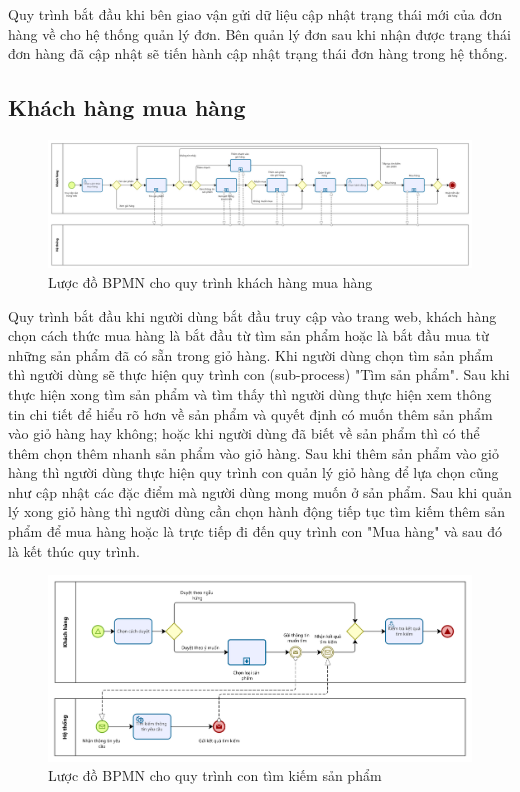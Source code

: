 Quy trình bắt đầu khi bên giao vận gửi dữ liệu cập nhật trạng thái mới của đơn hàng về cho hệ thống quản lý đơn. Bên quản lý đơn sau khi nhận được trạng thái đơn hàng đã cập nhật sẽ tiến hành cập nhật trạng thái đơn hàng trong hệ thống.

\subsection{Khách hàng mua hàng}
\begin{figure}[!htp]
    \centering
    \includegraphics[width=17cm]{img/BPMN/customer_buy/customer_buy.png}
    \newline
    \caption{Lược đồ BPMN cho quy trình khách hàng mua hàng}
\end{figure}
 
Quy trình bắt đầu khi người dùng bắt đầu truy cập vào trang web, khách hàng chọn cách thức mua hàng là bắt đầu từ tìm sản phẩm hoặc là bắt đầu mua từ những sản phẩm đã có sẵn trong giỏ hàng. Khi người dùng chọn tìm sản phẩm thì người dùng sẽ thực hiện quy trình con (sub-process) "Tìm sản phẩm". Sau khi thực hiện xong tìm sản phẩm và tìm thấy thì người dùng thực hiện xem thông tin chi tiết để hiểu rõ hơn về sản phẩm và quyết định có muốn thêm sản phẩm vào giỏ hàng hay không; hoặc khi người dùng đã biết về sản phẩm thì có thể thêm chọn thêm nhanh sản phẩm vào giỏ hàng. Sau khi thêm sản phẩm vào giỏ hàng thì người dùng thực hiện quy trình con quản lý giỏ hàng để lựa chọn cũng như cập nhật các đặc điểm mà người dùng mong muốn ở sản phẩm. Sau khi quản lý xong giỏ hàng thì người dùng cần chọn hành động tiếp tục tìm kiếm thêm sản phẩm để mua hàng hoặc là trực tiếp đi đến quy trình con "Mua hàng" và sau đó là kết thúc quy trình.
 
 
\begin{figure}[!htp]
    \centering
    \includegraphics[width=13cm]{img/BPMN/customer_buy/customer_search_product.png}
    \newline
    \caption{Lược đồ BPMN cho quy trình con tìm kiếm sản phẩm}
\end{figure}
 
